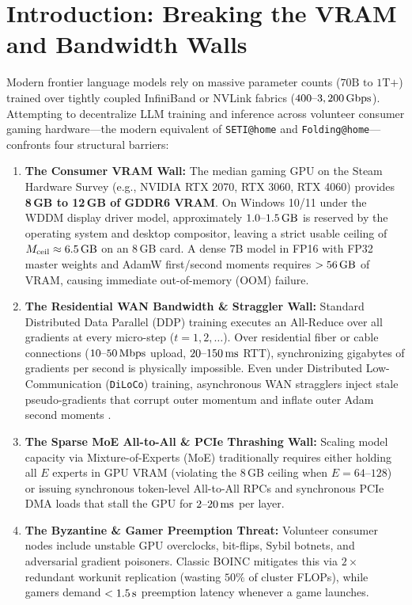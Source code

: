 \documentclass[11pt,a4paper]{article}
\begin{document}
\section{Introduction: Breaking the VRAM and Bandwidth Walls}

Modern frontier language models rely on massive parameter counts ($70\text{B} \text{ to } 1\text{T+}$) trained over tightly coupled InfiniBand or NVLink fabrics ($400\text{--}3,200\text{\,Gbps}$). Attempting to decentralize LLM training and inference across volunteer consumer gaming hardware---the modern equivalent of \texttt{SETI@home} \cite{anderson2002boinc} and \texttt{Folding@home}---confronts four structural barriers:

\begin{enumerate}[leftmargin=1.8em]
    \item \textbf{The Consumer VRAM Wall:} The median gaming GPU on the Steam Hardware Survey (e.g., NVIDIA RTX 2070, RTX 3060, RTX 4060) provides \textbf{8\,GB to 12\,GB of GDDR6 VRAM}. On Windows 10/11 under the WDDM display driver model, approximately $1.0\text{--}1.5\text{\,GB}$ is reserved by the operating system and desktop compositor, leaving a strict usable ceiling of $M_{\text{ceil}} \approx 6.5\text{\,GB}$ on an 8\,GB card. A dense 7B model in FP16 with FP32 master weights and AdamW first/second moments requires $>56\text{\,GB}$ of VRAM, causing immediate out-of-memory (OOM) failure.
    \item \textbf{The Residential WAN Bandwidth \& Straggler Wall:} Standard Distributed Data Parallel (DDP) training executes an All-Reduce over all gradients at every micro-step ($t = 1, 2, \dots$). Over residential fiber or cable connections ($10\text{--}50\text{\,Mbps}$ upload, $20\text{--}150\text{\,ms}$ RTT), synchronizing gigabytes of gradients per second is physically impossible. Even under Distributed Low-Communication (\texttt{DiLoCo}) \cite{douillard2023diloco} training, asynchronous WAN stragglers inject stale pseudo-gradients that corrupt outer momentum and inflate outer Adam second moments \cite{shah2026cgad}.
    \item \textbf{The Sparse MoE All-to-All \& PCIe Thrashing Wall:} Scaling model capacity via Mixture-of-Experts (MoE) \cite{fedus2022switch,sukhbaatar2024btm,charles2025scalingdiloco} traditionally requires either holding all $E$ experts in GPU VRAM (violating the 8\,GB ceiling when $E = 64\text{--}128$) or issuing synchronous token-level All-to-All RPCs and synchronous PCIe DMA loads that stall the GPU for $2\text{--}20\text{\,ms}$ per layer.
    \item \textbf{The Byzantine \& Gamer Preemption Threat:} Volunteer consumer nodes include unstable GPU overclocks, bit-flips, Sybil botnets, and adversarial gradient poisoners. Classic BOINC mitigates this via $2\times$ redundant workunit replication (wasting $50\%$ of cluster FLOPs), while gamers demand $<1.5\text{\,s}$ preemption latency whenever a game launches.
\end{enumerate}
\end{document}
